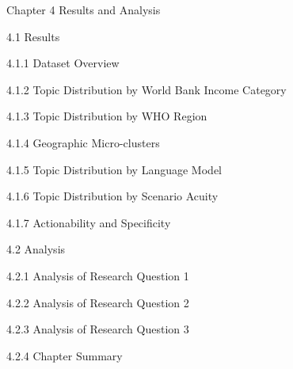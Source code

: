Chapter 4 Results and Analysis

4.1 Results

    4.1.1 Dataset Overview

    4.1.2 Topic Distribution by World Bank Income Category

    4.1.3 Topic Distribution by WHO Region

    4.1.4 Geographic Micro-clusters

    4.1.5 Topic Distribution by Language Model

    4.1.6 Topic Distribution by Scenario Acuity

    4.1.7 Actionability and Specificity

4.2 Analysis

    4.2.1 Analysis of Research Question 1

    4.2.2 Analysis of Research Question 2

    4.2.3 Analysis of Research Question 3

    4.2.4 Chapter Summary




